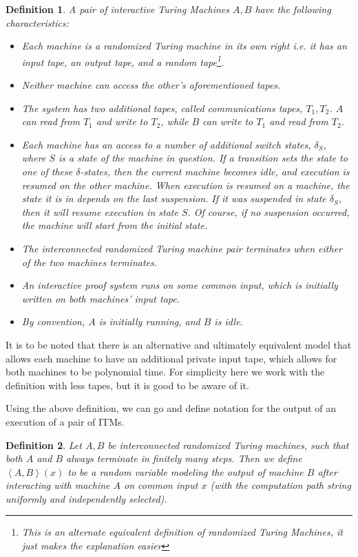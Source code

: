 \documentclass{article}
\newtheorem{definition}{Definition}
\begin{document}
\begin{definition}
    A pair of interactive Turing Machines $A, B$ have the following characteristics:
    \begin{itemize}
        \item Each machine is a randomized Turing machine in its own right i.e. it has an input tape, an output tape, and a random tape\footnote{This is an alternate equivalent definition of randomized Turing Machines, it just makes the explanation easier}.
        \item Neither machine can access the other's aforementioned tapes.
        \item The system has two additional tapes, called communications tapes, $T_1, T_2$. $A$ can read from $T_1$ and write to $T_2$, while $B$ can write to $T_1$ and read from $T_2$.
        \item Each machine has an access to a number of additional switch states, $\delta_S$, where $S$ is a state of the machine in question. If a transition sets the state to one of these $\delta$-states, then the current machine becomes idle, and execution is resumed on the other machine. When execution is resumed on a machine, the state it is in depends on the last suspension. If it was suspended in state $\delta_S$, then it will resume execution in state $S$. Of course, if no suspension occurred, the machine will start from the initial state.
        \item The interconnected randomized Turing machine pair terminates when either of the two machines terminates.
        \item An interactive proof system runs on some common input, which is initially written on both machines' input tape.
        \item By convention, $A$ is initially running, and $B$ is idle.
    \end{itemize}
\end{definition}

It is to be noted that there is an alternative and ultimately equivalent model that allows each machine to have an additional private input tape, which allows for both machines to be polynomial time. For simplicity here we work with the definition with less tapes, but it is good to be aware of it.

Using the above definition, we can go and define notation for the output of an execution of a pair of ITMs.

\begin{definition}
    Let $A, B$ be interconnected randomized Turing machines, such that both $A$ and $B$ always terminate in finitely many steps. Then we define $\left<A, B \right>(x)$ to be a random variable modeling the output of machine $B$ after interacting with machine $A$ on common input $x$ (with the computation path string uniformly and independently selected).
\end{definition}
\end{document}
